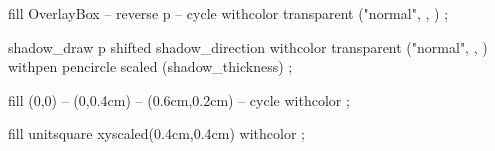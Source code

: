   fill OverlayBox -- reverse p -- cycle
       withcolor transparent ("normal",
         ,
         ) ;
\stopuseMPgraphic


  shadow_draw p shifted shadow_direction 
       withcolor transparent ("normal",
         ,
         ) 
       withpen pencircle scaled (shadow_thickness) ;
\stopuseMPgraphic



  fill (0,0) -- (0,0.4cm) -- (0.6cm,0.2cm) -- cycle 
       withcolor  ;
\stopuniqueMPgraphic

  fill unitsquare xyscaled(0.4cm,0.4cm) 
       withcolor  ;
\stopuniqueMPgraphic


\protect

\stopmodule

